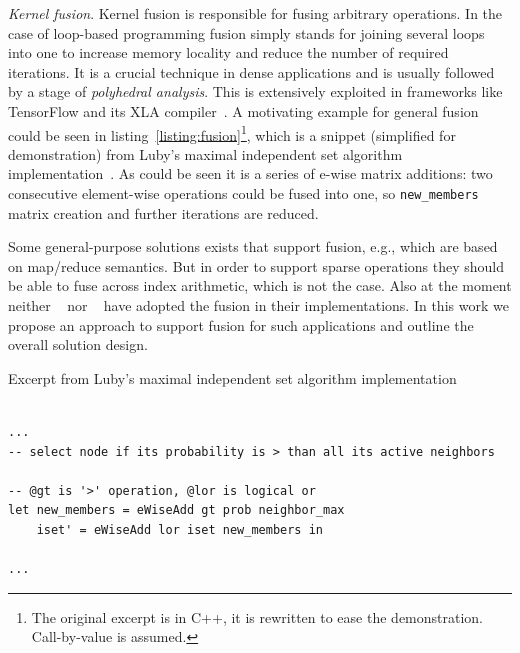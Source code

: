 \documentclass[acmsmall,review,nonacm]{acmart}\settopmatter{printfolios=true,printccs=false,printacmref=false}
\begin{document}
\emph{Kernel fusion}. 
Kernel fusion is responsible for fusing arbitrary operations. In the case of loop-based programming fusion simply stands for joining several loops into one to increase memory locality and reduce the number of required iterations. It is a crucial technique in dense applications and is usually followed by a stage of \emph{polyhedral analysis}. This is extensively exploited in frameworks like TensorFlow and its XLA compiler~\cite{TensorFlowXLA}. A motivating example for general fusion could be seen in listing~\ref{listing:fusion}\footnote{The original excerpt is in C++, it is rewritten to ease the demonstration. Call-by-value is assumed.}, which is a snippet (simplified for demonstration) from Luby’s maximal independent set algorithm implementation~\cite{SuiteSparseOnly}. As could be seen it is a series of  e-wise matrix additions: two consecutive element-wise operations could be fused into one, so \texttt{new\_members} matrix creation and further iterations are reduced. 

Some general-purpose solutions exists that support fusion, e.g., \cite{Futhark} which are based on map/reduce semantics. But in order to support sparse operations they should be able to fuse across index arithmetic, which is not the case. Also at the moment neither ~\cite{SuiteSparse}  nor ~\cite{yang2020graphblast} have adopted the fusion in their implementations. In this work we propose an approach to support fusion for such applications and outline the overall solution design.






\begin{listing}
\centering
\caption{Excerpt from Luby’s maximal independent set algorithm implementation}
\label{listing:fusion}
\begin{verbatim}

...
-- select node if its probability is > than all its active neighbors

-- @gt is '>' operation, @lor is logical or 
let new_members = eWiseAdd gt prob neighbor_max
    iset' = eWiseAdd lor iset new_members in 
    
...

\end{verbatim}
\end{listing}
\end{document}
